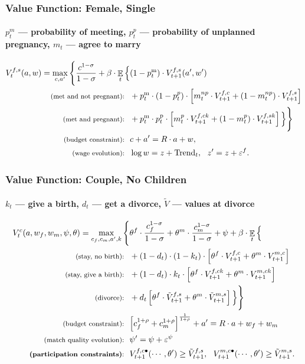 \documentclass[aspectratio=169]{beamer}
\DeclareMathOperator{\E}{\mathbb{E}}
\begin{document}
\begin{frame}
\frametitle{Value Function: Female, Single}
\framesubtitle{$p^m_t$ --- probability of meeting, $p^p_t$ --- probability of unplanned pregnancy, $m_t$ --- agree to marry}
\begin{align*}
V^{f,s}_t(a,w) = \max\limits_{c,a'} \Bigg\{ \frac{c^{1-\sigma}}{1-\sigma} + \beta \cdot \E_t \Big\{  & 
(1-p^{\text{m}}_t)\cdot V_{t+1}^{f,s}(a',w') \\
\text{ \footnotesize (met and not pregnant): \ }& +  p^{\text{m}}_t\cdot (1- p^{p}_t) \cdot \left[ m^{np}_t \cdot V^{f,c}_{t+1}  + (1-m^{np}_t)\cdot  V^{f,s}_{t+1}\right] \\
\text{ \footnotesize (met and pregnant): \ } & + p^{\text{m}}_t \cdot p^{\text{p}}_t\cdot   \left[ m^p_t \cdot V^{f,ck}_{t+1}  + (1-m^p_t)\cdot  V^{f,sk}_{t+1}\right] \Big\} \Bigg\} \\
\text{ \footnotesize (budget constraint): \ } & c + a' = R\cdot a  + w , \\
\text{ \footnotesize (wage evolution): \ } & \log w = z + \text{Trend}_t, \ \ z' = z + \varepsilon^{f}.
\end{align*}
\end{frame}


\begin{frame}
\frametitle{Value Function: Couple, No Children}
\framesubtitle{$k_t$ --- give a birth, $d_t$ --- get a divorce, $\tilde{V}$ --- values at divorce}
\begin{align*}
V^{c}_t(a,w_f,w_m,\psi,\theta) = \max\limits_{c_f,c_m,a',k} \Bigg\{ & \theta^f \cdot \frac{c_f^{1-\sigma}}{{1-\sigma}}  + \theta^m \cdot \frac{c_m^{1-\sigma}}{1-\sigma}  + \psi + \beta \cdot \E_t \Big\{   \\
\text{ \footnotesize (stay, no birth): \ } & + (1-d_t) \cdot (1-k_t) \cdot  \left[ \theta^f \cdot  V^{f,c}_{t+1} + \theta^m \cdot V^{m,c}_{t+1}  \right] \\
\text{ \footnotesize (stay, give a birth): \ } &  + (1-d_t) \cdot k_t \cdot  \left[ \theta^f \cdot  V^{f,ck}_{t+1} + \theta^m \cdot V^{m,ck}_{t+1}  \right]  \\
\text{ \footnotesize (divorce): \ } & + d_t  \left[ \theta^f \cdot  \tilde{V}^{f,s}_{t+1} + \theta^m \cdot \tilde{V}^{m,s}_{t+1}  \right]  \Big\} \Bigg\}\\
\text{ \footnotesize (budget constraint): \ } &{\normalsize \left[c_f^{1+\rho} + c_m^{1+\rho}\right]^{\frac1{1+\rho}} + a' = R\cdot a + w_f + w_m}\\
\text{ \footnotesize (match quality evolution): \ } &{\normalsize \psi' = \psi + \varepsilon^{\psi}}\\
\text{ \footnotesize \textbf{(participation constraints)}: \ } &{\normalsize V^{f,c\bullet}_{t+1} (\cdots,\theta') \geq \tilde{V}^{f,s}_{t+1}, \ \ V^{m,c\bullet}_{t+1} (\cdots,\theta') \geq \tilde{V}^{m,s}_{t+1}.}\\
\end{align*}
\end{frame}
\end{document}
